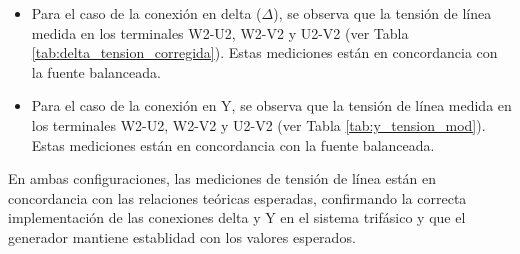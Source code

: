 \documentclass[conference]{IEEEtran}
\theoremstyle{mytheoremstyle}
\theoremstyle{mytheoremstyle}
\theoremstyle{myproblemstyle}
\begin{document}
\begin{itemize}
    \item Para el caso de la conexión en delta ($\Delta$), se observa que la tensión de línea medida en los terminales W2-U2, W2-V2 y U2-V2 (ver Tabla \ref{tab:delta_tension_corregida}). Estas mediciones están en concordancia con la fuente balanceada.
    \item Para el caso de la conexión en Y, se observa que la tensión de línea medida en los terminales W2-U2, W2-V2 y U2-V2 (ver Tabla \ref{tab:y_tension_mod}). Estas mediciones están en concordancia con la fuente balanceada.
 
\end{itemize}

En ambas configuraciones, las mediciones de tensión de línea están en concordancia con las relaciones teóricas esperadas, confirmando la correcta implementación de las conexiones delta y Y en el sistema trifásico y que el generador mantiene establidad con los valores esperados.
\end{document}
